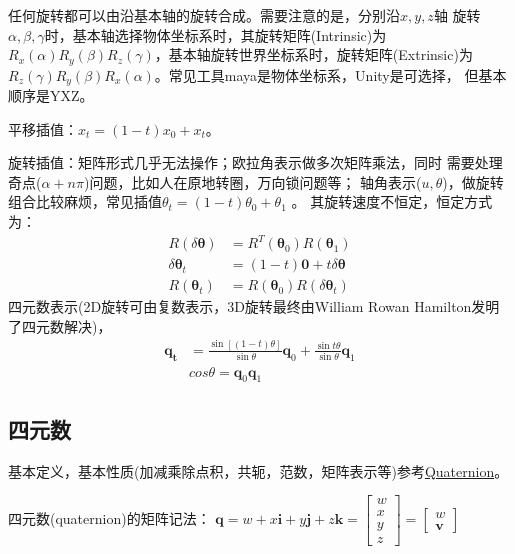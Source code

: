 \documentclass[lang=cn,newtx,10pt,scheme=chinese]{elegantbook}
\begin{document}
任何旋转都可以由沿基本轴的旋转合成。需要注意的是，分别沿$x,y,z$轴
旋转$\alpha, \beta, \gamma$时，基本轴选择物体坐标系时，其旋转矩阵(Intrinsic)为
$R_x(\alpha)R_y(\beta)R_z(\gamma)$，基本轴旋转世界坐标系时，旋转矩阵(Extrinsic)为
$R_z(\gamma)R_y(\beta)R_x(\alpha)$。常见工具maya是物体坐标系，Unity是可选择，
但基本顺序是YXZ。

平移插值：$x_t = (1-t)x_0 + x_t$。

旋转插值：矩阵形式几乎无法操作；欧拉角表示做多次矩阵乘法，同时
需要处理奇点($\alpha+n\pi$)问题，比如人在原地转圈，万向锁问题等；
轴角表示($u, \theta$)，做旋转组合比较麻烦，常见插值$\theta_t=(1-t)\theta_0 + \theta_1$ 。
其旋转速度不恒定，恒定方式为：\begin{equation}
  \begin{aligned}
  R(\delta \boldsymbol{\theta}) & =R^T\left(\boldsymbol{\theta}_0\right) R\left(\boldsymbol{\theta}_1\right) \\
  \delta \boldsymbol{\theta}_t & =(1-t) \mathbf{0}+t \delta \boldsymbol{\theta} \\
  R\left(\boldsymbol{\theta}_t\right) & =R\left(\boldsymbol{\theta}_0\right) R\left(\delta \boldsymbol{\theta}_t\right)
  \end{aligned}
\end{equation}
四元数表示(2D旋转可由复数表示，3D旋转最终由William Rowan Hamilton发明了四元数解决)，
\begin{equation}
  \label{WilliamRowanHamilton}
  \begin{aligned}
  \boldsymbol{q}_{\boldsymbol{t}} & =\frac{\sin [(1-t) \theta]}{\sin \theta} \boldsymbol{q}_0+\frac{\sin t \theta}{\sin \theta} \boldsymbol{q}_1 \\
  & cos \theta  = \boldsymbol{q}_0 \boldsymbol{q}_1
  \end{aligned}
\end{equation}

\subsection{四元数}
基本定义，基本性质(加减乘除点积，共轭，范数，矩阵表示等)参考\href{https://en.wikipedia.org/wiki/Quaternion}{Quaternion}。

四元数(quaternion)的矩阵记法：
$\boldsymbol{q} = w + x\boldsymbol{i} + y\boldsymbol{j} + z\boldsymbol{k}=
\left[\begin{array}{l}
  w \\
  x \\
  y \\
  z
  \end{array}\right]
= 
\left[\begin{array}{l}
  w \\
  \boldsymbol{v}
  \end{array}\right]
  $
\end{document}
